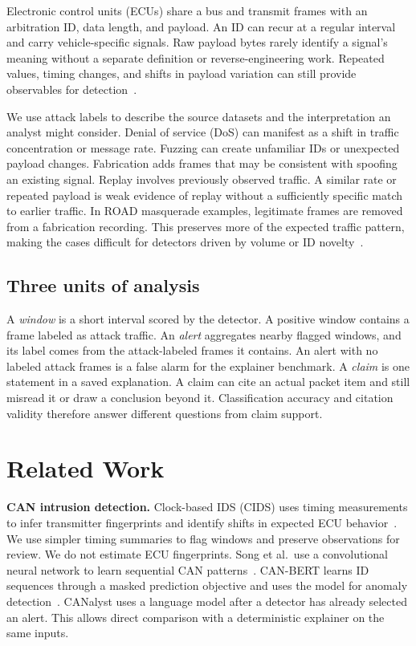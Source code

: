 \documentclass[sigconf,pbalance=true]{acmart}
\begin{document}
Electronic control units (ECUs) share a bus and transmit frames with an arbitration ID, data length, and payload. An ID can recur at a regular interval and carry vehicle-specific signals. Raw payload bytes rarely identify a signal's meaning without a separate definition or reverse-engineering work. Repeated values, timing changes, and shifts in payload variation can still provide observables for detection~\cite{marchetti2019read,kulandaivel2019canvas}.

We use attack labels to describe the source datasets and the interpretation an analyst might consider. Denial of service (DoS) can manifest as a shift in traffic concentration or message rate. Fuzzing can create unfamiliar IDs or unexpected payload changes. Fabrication adds frames that may be consistent with spoofing an existing signal. Replay involves previously observed traffic. A similar rate or repeated payload is weak evidence of replay without a sufficiently specific match to earlier traffic. In ROAD masquerade examples, legitimate frames are removed from a fabrication recording. This preserves more of the expected traffic pattern, making the cases difficult for detectors driven by volume or ID novelty~\cite{verma2024road}.

\subsection{Three units of analysis}

A \emph{window} is a short interval scored by the detector. A positive window contains a frame labeled as attack traffic. An \emph{alert} aggregates nearby flagged windows, and its label comes from the attack-labeled frames it contains. An alert with no labeled attack frames is a false alarm for the explainer benchmark. A \emph{claim} is one statement in a saved explanation. A claim can cite an actual packet item and still misread it or draw a conclusion beyond it. Classification accuracy and citation validity therefore answer different questions from claim support.

\section{Related Work}

\textbf{CAN intrusion detection.}
Clock-based IDS (CIDS) uses timing measurements to infer transmitter fingerprints and identify shifts in expected ECU behavior~\cite{cho2016cids}. We use simpler timing summaries to flag windows and preserve observations for review. We do not estimate ECU fingerprints. Song et al.\ use a convolutional neural network to learn sequential CAN patterns~\cite{song2020carhacking}. CAN-BERT learns ID sequences through a masked prediction objective and uses the model for anomaly detection~\cite{alkhatib2022canbert}. CANalyst uses a language model after a detector has already selected an alert. This allows direct comparison with a deterministic explainer on the same inputs.
\end{document}
